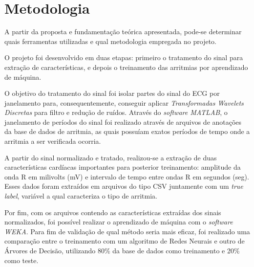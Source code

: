 \documentclass[conference]{IEEEtran}
\begin{document}


\section{Metodologia}

A partir da proposta e fundamentação teórica apresentada, pode-se determinar quais ferramentas utilizadas e qual metodologia empregada no projeto. 

O projeto foi desenvolvido em duas etapas: primeiro o tratamento do sinal para extração de características, e depois o treinamento das arritmias por aprendizado de máquina.

O objetivo do tratamento do sinal foi isolar partes do sinal do ECG por janelamento para, consequentemente, conseguir aplicar \textit{Transformadas Wavelets Discretas} para filtro e redução de ruídos. Através do \textit{software MATLAB}, o janelamento de períodos do sinal foi realizado através de arquivos de anotações da base de dados de arritmia, as quais possuíam exatos períodos de tempo onde a arritmia a ser verificada ocorria.

A partir do sinal normalizado e tratado, realizou-se a extração de duas características cardíacas importantes para posterior treinamento: amplitude da onda R em milivolts (mV) e intervalo de tempo entre ondas R em segundos (seg). Esses dados foram extraídos em arquivos do tipo CSV juntamente com um \textit{true label}, variável a qual caracteriza o tipo de arritmia.

Por fim, com os arquivos contendo as características extraídas dos sinais normalizados, foi possível realizar o aprendizado de máquina com o \textit{software WEKA}. Para fim de validação de qual método seria mais eficaz, foi realizado uma comparação entre o treinamento com um algoritmo de Redes Neurais e outro de Árvores de Decisão, utilizando 80\% da base de dados como treinamento e 20\% como teste.

%
\end{document}
